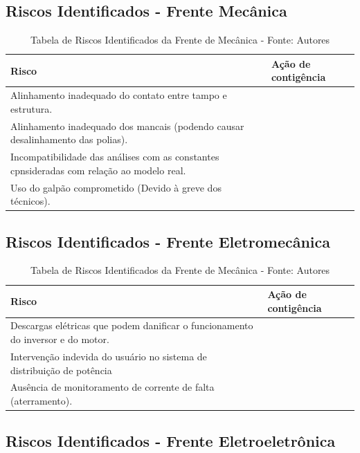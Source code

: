 \subsection*{Riscos Identificados - Frente Mecânica}

\begin{table}[H]
    \begin{tabular}{|p{7cm}|p{7cm}|}
        \hline
        \textbf{Risco} & \textbf{Ação de contigência} \\ \hline
        Alinhamento inadequado do contato entre tampo e estrutura. &  \\ \hline
        Alinhamento inadequado dos mancais (podendo causar desalinhamento das polias). & \\ \hline
        Incompatibilidade das análises com as constantes cpnsideradas com relação ao modelo real. & \\ \hline
        Uso do galpão comprometido (Devido à greve dos técnicos). & \\ \hline
    \end{tabular}
    \caption{Tabela de Riscos Identificados da Frente de Mecânica - Fonte: Autores}
    \label{tab:tabela_riscos_mecanica}
\end{table}

\subsection*{Riscos Identificados - Frente Eletromecânica}

\begin{table}[H]
    \begin{tabular}{|p{7cm}|p{7cm}|}
        \hline
        \textbf{Risco} & \textbf{Ação de contigência} \\ \hline
        Descargas elétricas que podem danificar o funcionamento do inversor e do motor. &  \\ \hline
        Intervenção indevida do usuário no sistema de distribuição de potência & \\ \hline
        Ausência de monitoramento de corrente de falta (aterramento). & \\ \hline
    \end{tabular}
    \caption{Tabela de Riscos Identificados da Frente de Mecânica - Fonte: Autores}
    \label{tab:tabela_riscos_mecanica}
\end{table}

\subsection*{Riscos Identificados - Frente Eletroeletrônica}

